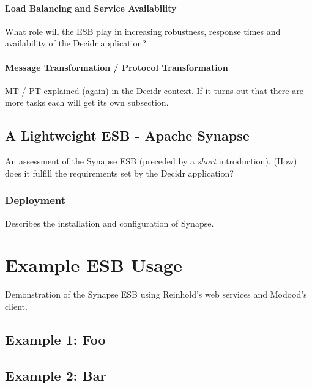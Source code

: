 \subsubsection{Load Balancing and Service Availability}
\label{subsubsec:load-balancing-and-service-availability}
What role will the ESB play in increasing robustness, response times and
availability of the Decidr application?

\subsubsection{Message Transformation / Protocol Transformation}
\label{subsubsec:message-transformation-protocol-transformation}
MT / PT explained (again) in the Decidr context. If it turns out that there are
more tasks each will get its own subsection.

\section{A Lightweight ESB - Apache Synapse}
\label{sec:a-lightweight-esb-apache-synapse}

An assessment of the Synapse ESB (preceded by a \emph{short} introduction).
(How) does it fulfill the requirements set by the Decidr application? 

\subsection{Deployment}
\label{subsec:deployment}
Describes the installation and configuration of Synapse.

\chapter{Example ESB Usage}
\label{chap:example-esb-usage}

Demonstration of the Synapse ESB using Reinhold's web services and Modood's
client.

\section{Example 1: Foo}

\section{Example 2: Bar}

